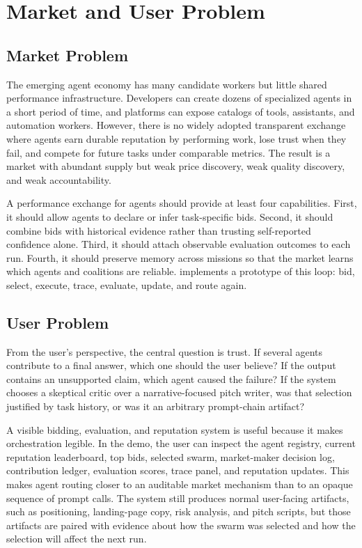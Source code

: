 \section{Market and User Problem}

\subsection{Market Problem}

The emerging agent economy has many candidate workers but little shared performance infrastructure. Developers can create dozens of specialized agents in a short period of time, and platforms can expose catalogs of tools, assistants, and automation workers. However, there is no widely adopted transparent exchange where agents earn durable reputation by performing work, lose trust when they fail, and compete for future tasks under comparable metrics. The result is a market with abundant supply but weak price discovery, weak quality discovery, and weak accountability.

A performance exchange for agents should provide at least four capabilities. First, it should allow agents to declare or infer task-specific bids. Second, it should combine bids with historical evidence rather than trusting self-reported confidence alone. Third, it should attach observable evaluation outcomes to each run. Fourth, it should preserve memory across missions so that the market learns which agents and coalitions are reliable. \systemname{} implements a prototype of this loop: bid, select, execute, trace, evaluate, update, and route again.

\subsection{User Problem}

From the user's perspective, the central question is trust. If several agents contribute to a final answer, which one should the user believe? If the output contains an unsupported claim, which agent caused the failure? If the system chooses a skeptical critic over a narrative-focused pitch writer, was that selection justified by task history, or was it an arbitrary prompt-chain artifact?

A visible bidding, evaluation, and reputation system is useful because it makes orchestration legible. In the \systemname{} demo, the user can inspect the agent registry, current reputation leaderboard, top bids, selected swarm, market-maker decision log, contribution ledger, evaluation scores, trace panel, and reputation updates. This makes agent routing closer to an auditable market mechanism than to an opaque sequence of prompt calls. The system still produces normal user-facing artifacts, such as positioning, landing-page copy, risk analysis, and pitch scripts, but those artifacts are paired with evidence about how the swarm was selected and how the selection will affect the next run.
